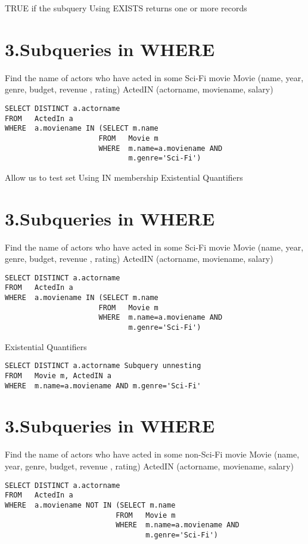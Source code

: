 \documentclass{article}
\begin{document}
TRUE if the subquery Using EXISTS returns one or more records

\section*{3.Subqueries in WHERE}

Find the name of actors who have acted in some Sci-Fi movie Movie (name, year, genre, budget, revenue , rating) ActedIN (actorname, moviename, salary)

\begin{verbatim}
SELECT DISTINCT a.actorname
FROM   ActedIn a
WHERE  a.moviename IN (SELECT m.name
                      FROM   Movie m
                      WHERE  m.name=a.moviename AND
                             m.genre='Sci-Fi')
\end{verbatim}

Allow us to test set Using IN membership Existential Quantifiers

\section*{3.Subqueries in WHERE}

Find the name of actors who have acted in some Sci-Fi movie Movie (name, year, genre, budget, revenue , rating) ActedIN (actorname, moviename, salary)

\begin{verbatim}
SELECT DISTINCT a.actorname
FROM   ActedIn a
WHERE  a.moviename IN (SELECT m.name
                      FROM   Movie m
                      WHERE  m.name=a.moviename AND
                             m.genre='Sci-Fi')
\end{verbatim}

Existential Quantifiers

\begin{verbatim}
SELECT DISTINCT a.actorname Subquery unnesting
FROM   Movie m, ActedIN a
WHERE  m.name=a.moviename AND m.genre='Sci-Fi'
\end{verbatim}

\section*{3.Subqueries in WHERE}

Find the name of actors who have acted in some non-Sci-Fi movie Movie (name, year, genre, budget, revenue , rating) ActedIN (actorname, moviename, salary)

\begin{verbatim}
SELECT DISTINCT a.actorname
FROM   ActedIn a
WHERE  a.moviename NOT IN (SELECT m.name
                          FROM   Movie m
                          WHERE  m.name=a.moviename AND
                                 m.genre='Sci-Fi')
\end{verbatim}
\end{document}
